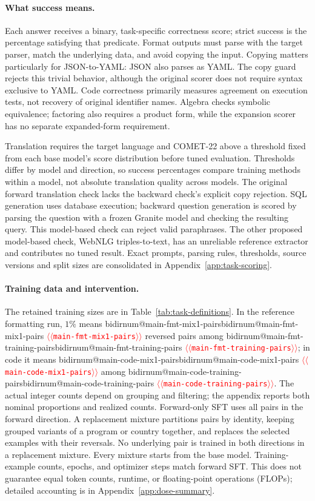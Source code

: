 \documentclass[11pt]{article}
\makeatletter
\providecommand{\NUM}[1]{%
  \ifcsname bidirnum@#1\endcsname\csname bidirnum@#1\endcsname
  \else\textcolor{red}{$\langle\langle$\texttt{#1}$\rangle\rangle$}\fi}
\makeatother
\begin{document}
\paragraph{What success means.}
Each answer receives a binary, task-specific correctness score; strict success is the
percentage satisfying that predicate. Format outputs must parse with the target parser,
match the underlying data, and avoid copying the input. Copying matters particularly for
JSON-to-YAML: JSON also parses as YAML. The copy guard rejects this trivial behavior,
although the original scorer does not require syntax exclusive to YAML. Code correctness
primarily measures agreement on execution tests, not recovery of original identifier names.
Algebra checks symbolic equivalence; factoring also requires a product form, while the
expansion scorer has no separate expanded-form requirement.

Translation requires the target language and COMET-22 above a threshold fixed from each
base model's score distribution before tuned evaluation. Thresholds differ by model and
direction, so success percentages compare training methods within a model, not absolute
translation quality across models. The original forward translation check lacks the
backward check's explicit copy rejection. SQL generation uses database execution; backward
question generation is scored by parsing the question with a frozen Granite model and
checking the resulting query. This model-based check can reject valid paraphrases.
The other proposed model-based check, WebNLG triples-to-text, has an unreliable reference
extractor and contributes no tuned result. Exact prompts, parsing rules, thresholds,
source versions and split sizes are consolidated in Appendix~\ref{app:task-scoring}.

\paragraph{Training data and intervention.}
The retained training sizes are in Table~\ref{tab:task-definitions}. In the reference
formatting run, $1\%$ means \NUM{main-fmt-mix1-pairs} reversed pairs among
\NUM{main-fmt-training-pairs}; in code it means \NUM{main-code-mix1-pairs} among
\NUM{main-code-training-pairs}. The actual integer counts depend on grouping and filtering;
the appendix reports both nominal proportions and realized counts.
Forward-only SFT uses all pairs in the forward direction. A replacement mixture partitions
pairs by identity, keeping grouped variants of a program or country together, and replaces
the selected examples with their reversals. No underlying pair is trained in both directions
in a replacement mixture. Every mixture starts from the base model. Training-example counts,
epochs, and optimizer steps match forward SFT. This does not guarantee equal token counts,
runtime, or floating-point operations (FLOPs); detailed accounting is in
Appendix~\ref{app:dose-summary}.
\end{document}
